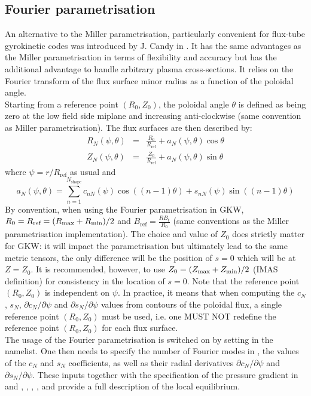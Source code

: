 \subsection{Fourier parametrisation}
An alternative to the Miller parametrisation, particularly convenient for flux-tube gyrokinetic codes was introduced by J. Candy in \cite{CAN09}. It has the same advantages as the Miller parametrisation in terms of flexibility and accuracy but has the additional advantage to handle arbitrary plasma cross-sections. It relies on the Fourier transform of the flux surface minor radius as a function of the poloidal angle.\\
Starting from a reference point $(R_0,Z_0)$, the poloidal angle $\theta$ is defined as being zero at the low field side miplane and increasing anti-clockwise (same convention as Miller parametrisation). The flux surfaces are then described by:
\begin{eqnarray}
 R_N(\psi,\theta) &=& \frac{R_0}{R_\textrm{ref}} + a_N(\psi,\theta)\cos{\theta}\\
 Z_N(\psi,\theta) &=& \frac{Z_0}{R_\textrm{ref}} + a_N(\psi,\theta)\sin{\theta}
\end{eqnarray} 
where $\psi=r/R_\textrm{ref}$ as usual and 
\begin{equation}
a_N(\psi,\theta)=\sum_{n=1}^{N_\textrm{shape}} c_{nN}(\psi)\cos((n-1)\theta) + s_{nN}(\psi)\sin((n-1)\theta) 
\end{equation}
By convention, when using the Fourier parametrisation in GKW, $R_0=R_\textrm{ref}=(R_{\rm max} + R_{\rm min})/2$ and $B_\textrm{ref}=\frac{RB_t}{R_0}$  (same conventions as the Miller parametrisation implementation). The choice and value of $Z_0$ does strictly matter for GKW: it will impact the parametrisation but ultimately lead to the same metric tensors, the only difference will be the position of $s=0$ which will be at $Z=Z_0$. It is recommended, however, to use $Z_0=(Z_{\rm max} + Z_{\rm min})/2$ (IMAS definition) for consistency in the location of $s=0$. Note that the reference point $(R_0,Z_0)$ is independent on $\psi$. In practice, it means that when computing the $c_N$, $s_N$, $\partial c_N/\partial \psi$ and $\partial s_N/\partial \psi$ values from contours of the poloidal flux, a single reference point $(R_0,Z_0)$ must be used, i.e. one MUST NOT redefine the reference point $(R_0,Z_0)$ for each flux surface. \\
The usage of the Fourier parametrisation is switched on by setting  in the  namelist. One then needs to specify the number of Fourier modes in , the values of the $c_N$ and $s_N$ coefficients, as well as their radial derivatives $\partial c_N/\partial \psi$ and $\partial s_N/\partial \psi$. These inputs together with the specification of the pressure gradient in  and , , , ,  and  provide a full description of the local equilibrium.\\
